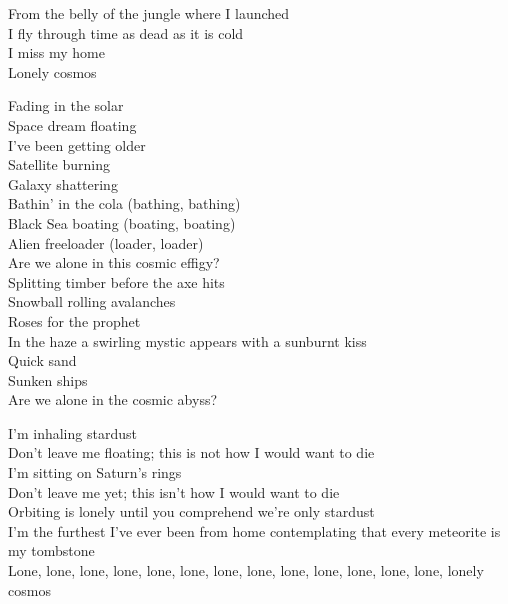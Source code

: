 


From the belly of the jungle where I launched \\
I fly through time as dead as it is cold \\
I miss my home \\
Lonely cosmos \\


Fading in the solar \\
Space dream floating \\
I've been getting older \\
Satellite burning \\
Galaxy shattering \\
Bathin' in the cola (bathing, bathing) \\
Black Sea boating (boating, boating) \\
Alien freeloader (loader, loader) \\
Are we alone in this cosmic effigy? \\

Splitting timber before the axe hits \\
Snowball rolling avalanches \\
Roses for the prophet \\
In the haze a swirling mystic appears with a sunburnt kiss \\
Quick sand \\
Sunken ships \\
Are we alone in the cosmic abyss? \\


I'm inhaling stardust \\
Don't leave me floating; this is not how I would want to die \\
I'm sitting on Saturn's rings \\
Don't leave me yet; this isn't how I would want to die \\
Orbiting is lonely until you comprehend we're only stardust \\
I'm the furthest I've ever been from home contemplating that every meteorite is my tombstone \\
Lone, lone, lone, lone, lone, lone, lone, lone, lone, lone, lone, lone, lone, lonely cosmos \\

